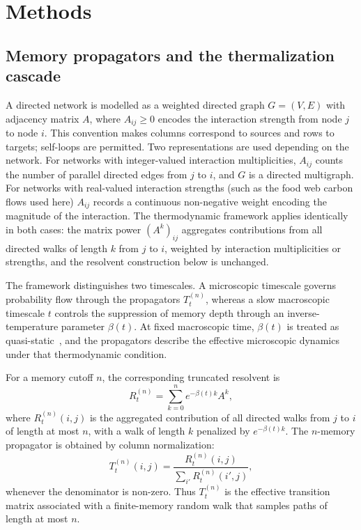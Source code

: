 \documentclass[aps,superscriptaddress,11pt]{revtex4-2}
\theoremstyle{definition}
\theoremstyle{plain}
\begin{document}
\section{Methods}

\subsection{Memory propagators and the thermalization cascade}
A directed network is modelled as a weighted directed graph
$G = (V, E)$ with adjacency matrix $A$, where $A_{ij} \geq 0$ encodes
the interaction strength from node $j$ to node $i$. This convention
makes columns correspond to sources and rows to targets; self-loops are
permitted. Two representations are used depending on the network.
For networks with integer-valued interaction multiplicities, $A_{ij}$
counts the number of parallel directed edges from $j$ to $i$, and $G$
is a directed multigraph. For networks with real-valued interaction
strengths (such as the food web carbon flows used here) $A_{ij}$
records a continuous non-negative weight encoding the magnitude of the
interaction. The thermodynamic framework applies identically in both
cases: the matrix power $(A^k)_{ij}$ aggregates contributions from
all directed walks of length $k$ from $j$ to $i$, weighted by
interaction multiplicities or strengths, and the resolvent construction
below is unchanged.

The framework distinguishes two timescales. A microscopic timescale
governs probability flow through the propagators $T_t^{(n)}$, whereas
a slow macroscopic timescale $t$ controls the suppression of memory
depth through an inverse-temperature parameter $\beta(t)$. At fixed
macroscopic time, $\beta(t)$ is treated as quasi-static~\cite{Callen1985}, and the
propagators describe the effective microscopic dynamics under that
thermodynamic condition.

For a memory cutoff $n$, the corresponding truncated resolvent is
\begin{equation}
  R_t^{(n)} = \sum_{k=0}^{n} e^{-\beta(t)k} A^k,
  \label{eq:resolvent_finite_methods}
\end{equation}
where $R_t^{(n)}(i,j)$ is the aggregated contribution of all directed walks from $j$
to $i$ of length at most $n$, with a walk of length $k$ penalized by
$e^{-\beta(t)k}$. The $n$-memory propagator is obtained by column
normalization:
\begin{equation}
  T_t^{(n)}(i,j)
  = \frac{R_t^{(n)}(i,j)}{\sum_{i'} R_t^{(n)}(i',j)},
  \label{eq:Tn_methods}
\end{equation}
whenever the denominator is non-zero. Thus $T_t^{(n)}$ is the effective transition 
matrix associated with a finite-memory random walk that samples paths of 
length at most $n$. 
\end{document}
